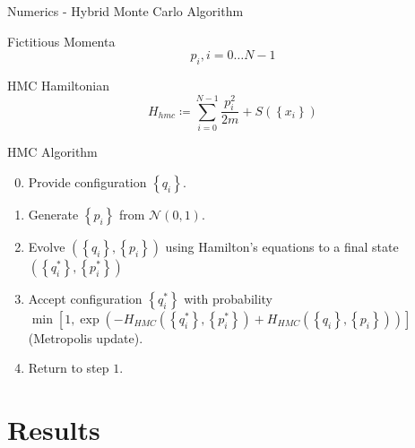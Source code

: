 \documentclass{beamer}
\begin{document}
\begin{frame}{Numerics - Hybrid Monte Carlo Algorithm}
    {
        \begin{block}{Fictitious Momenta}
            \begin{equation}
                p_i , i = 0 \dots {N-1}
            \end{equation}
        \end{block}
    }
    {
        \begin{block}{HMC Hamiltonian}
            \begin{equation}
                H_{hmc} \coloneqq \sum_{i=0}^{N-1} \frac{ p_{i}^{2} } {2m} + S\left(\left\{x_i\right\}\right)
            \end{equation}
        \end{block}
    }

    {
        \begin{block}{HMC Algorithm}
            \begin{enumerate} 
                \setcounter{enumi}{-1}

                \item<4-> Provide configuration $\left\{q_i\right\}$.

                \item<5-> Generate $\left\{p_i\right\}$ from $\mathcal{N}\left(0, 1\right)$.

                \item<6-> Evolve $\left(\left\{q_i \right\}, \left\{p_i \right\}\right)$ using Hamilton's equations to a final state $\left(\left\{q_i^*\right\}, \left\{p_{i}^{*} \right\}\right)$

                \item<7-> Accept configuration $ \left \{ q_{i}^{*} \right \} $ with probability $ \min{ \left [ 1 , \exp{ \left ( - H_{HMC} \left ( \left \{ q_{i}^{*} \right \} ,\left \{ p_{i}^{*} \right \} \right) + H_{HMC} \left ( \left \{ q_{i} \right \}, \left \{ p_{i} \right \} \right ) \right ) } \right ] } $ (Metropolis update).

                \item<8-> Return to step $1$.
            \end{enumerate}
        \end{block}
    }    
\end{frame}
    

\section{Results}
\end{document}
